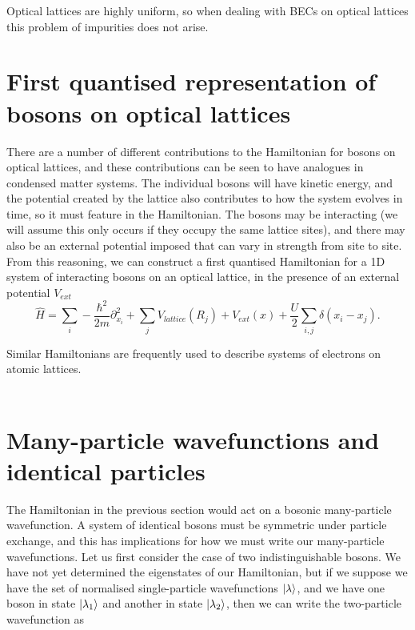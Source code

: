 \documentclass[a4paper,10pt]{article}
\begin{document}
Optical lattices are highly uniform, so when dealing with BECs on optical lattices this problem of impurities does not arise.



\section{First quantised representation of bosons on optical lattices}
There are a number of different contributions to the Hamiltonian for bosons on optical lattices, and these contributions can be seen to have analogues in condensed matter systems.
The individual bosons will have kinetic energy, and the potential created by the lattice also contributes to how the system evolves in time, so it must feature in the Hamiltonian.
The bosons may be interacting (we will assume this only occurs if they occupy the same lattice sites), and there may also be an external potential  imposed that can vary in strength
from site to site. From this reasoning, we can construct a first quantised Hamiltonian for a 1D system of interacting bosons on an optical lattice, in the presence of an external potential $V_{ext}$
\begin{equation}
 \hat{H}=\sum_{i}-\frac{\hbar^{2}}{2m}  \partial_{x_{i}}^2+\sum_{j}V_{lattice}(R_{j})+V_{ext}(x)+\frac{U}{2}\sum_{i,j}\delta(x_{i}-x_{j}).
\end{equation}

Similar Hamiltonians are frequently used to describe systems of electrons on atomic lattices.
\\\\

\section{Many-particle wavefunctions and identical particles \cite{Negele1988, Inkson1984, Altland2010}}
The Hamiltonian in the previous section would act on a bosonic many-particle wavefunction. A system of identical bosons must be symmetric under particle exchange, and this has 
implications for how we must write our many-particle wavefunctions. Let us first consider the case of two indistinguishable bosons. We have not yet determined the eigenstates 
of our Hamiltonian, but if we suppose we have the set of normalised single-particle wavefunctions $\ket{\lambda}$, and we have one boson in state $\ket{\lambda_1}$ and another
in state $\ket{\lambda_2}$, then we can write the two-particle wavefunction as
\end{document}
